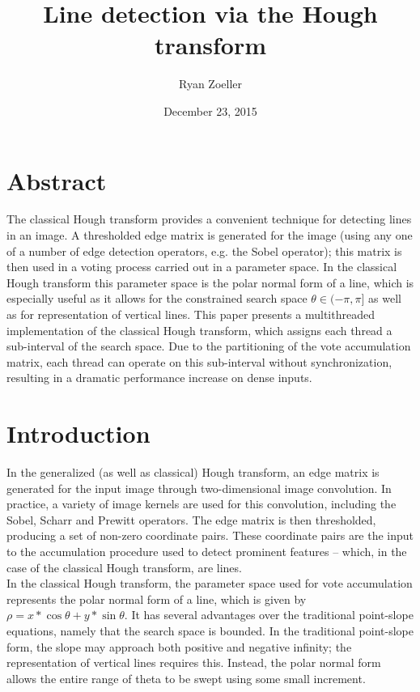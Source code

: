 \documentclass[letterpaper,12pt,titlepage]{article}
\title{Line detection via the Hough transform}
\date{December 23, 2015}
\author{Ryan Zoeller}
\begin{document}

\maketitle
\newpage

\section*{Abstract}
The classical Hough transform provides a convenient technique for detecting lines in an image.
A thresholded edge matrix is generated for the image (using any one of a number of edge detection
operators, e.g. the Sobel operator); this matrix is then used in a voting process carried
out in a parameter space. In the classical Hough transform this parameter space is the polar
normal form of a line, which is especially useful as it allows for the constrained
search space $\theta \in (-\pi,\pi]$ as well as for representation of vertical lines.
This paper presents a multithreaded implementation of the classical Hough transform, which assigns
each thread a sub-interval of the search space. Due to the partitioning of the vote accumulation
matrix, each thread can operate on this sub-interval without synchronization, resulting in a dramatic
performance increase on dense inputs.

\section{Introduction}
In the generalized (as well as classical) Hough transform, an edge matrix is generated
for the input image through two-dimensional image convolution. In practice, a variety of image
kernels are used for this convolution, including the Sobel, Scharr and Prewitt operators.
The edge matrix is then thresholded, producing a set of non-zero coordinate pairs.
These coordinate pairs are the input to the accumulation procedure used to detect prominent
features -- which, in the case of the classical Hough transform, are lines.
\\
In the classical Hough transform, the parameter space used for vote accumulation represents
the polar normal form of a line, which is given by $\rho=x*\cos{\theta}+y*\sin{\theta}$.
It has several advantages over the traditional point-slope equations, namely that the search
space is bounded. In the traditional point-slope form, the slope may approach both positive
and negative infinity; the representation of vertical lines requires this. Instead, the
polar normal form allows the entire range of theta to be swept using some small increment.
\end{document}
